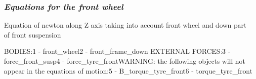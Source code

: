 \documentclass{article}
\begin{document}
\subsubsection{\textbf{\textit{Equations for the front wheel}}}
\begin{maplegroup}
\begin{Maple Normal}{
Equation of newton along Z axis taking into account front wheel and down part of front suspension}\end{Maple Normal}

\end{maplegroup}
\begin{maplegroup}
\begin{mapleinput}
\end{mapleinput}
\mapleresult
BODIES:1 - front\_wheel2 - front\_frame\_down
EXTERNAL FORCES:3 - force\_front\_susp4 - force\_tyre\_frontWARNING: the following objects will not appear in the equations of motion:5 - B\_torque\_tyre\_front6 - torque\_tyre\_front\mapleresult
\begin{maplelatex}
\end{maplelatex}
\end{maplegroup}
\end{document}
